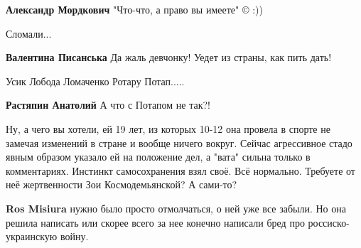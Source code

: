 \begin{itemize}
\begin{itemize}
\textbf{Александр Мордкович} "Что-что, а право вы имеете" © :))

\end{itemize}

 
Сломали...

\begin{itemize}

 
\textbf{Валентина Писанська} Да жаль девчонку! Уедет из страны, как пить дать!
\end{itemize}

 
Усик
Лобода
Ломаченко
Ротару
Потап.....

\begin{itemize}

 
\textbf{Растяпин Анатолий} А что с Потапом не так?!
\end{itemize}


Ну, а чего вы хотели, ей 19 лет, из которых 10-12 она провела в спорте не
замечая изменений в стране и вообще ничего вокруг. Сейчас агрессивное стадо
явным образом указало ей на положение дел, а "вата" сильна только в
комментариях. Инстинкт самосохранения взял своё. Всё нормально. Требуете от неё
жертвенности Зои Космодемьянской? А сами-то?

\begin{itemize}

 
\textbf{Ros Misiura} нужно было просто отмолчаться, о ней уже все забыли. Но
она решила написать или скорее всего за нее конечно написали бред про россиско-
украинскую войну.


\end{itemize}
\end{itemize}

